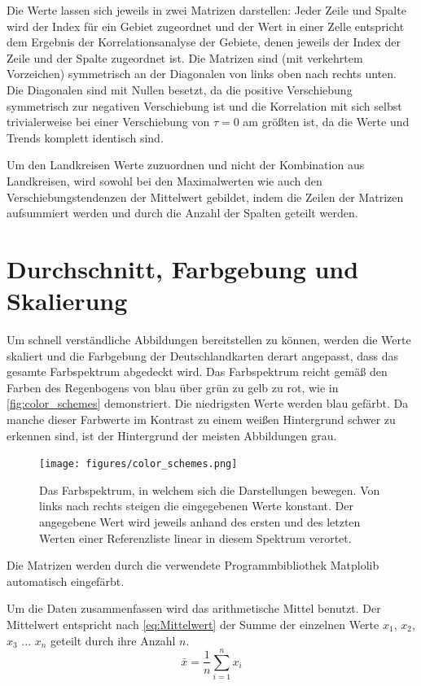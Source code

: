 Die Werte lassen sich jeweils in zwei Matrizen darstellen: Jeder Zeile und Spalte wird der Index für ein Gebiet zugeordnet und der Wert in einer Zelle entspricht dem Ergebnis der Korrelationsanalyse der Gebiete, denen jeweils der Index der Zeile und der Spalte zugeordnet ist.
Die Matrizen sind (mit verkehrtem Vorzeichen) symmetrisch an der Diagonalen von links oben nach rechts unten. Die Diagonalen sind mit Nullen besetzt, da die positive Verschiebung symmetrisch zur negativen Verschiebung ist und die Korrelation mit sich selbst trivialerweise bei einer Verschiebung von $\tau=0$ am größten ist, da die Werte und Trends komplett identisch sind.

Um den Landkreisen Werte zuzuordnen und nicht der Kombination aus Landkreisen, wird sowohl bei den Maximalwerten wie auch den Verschiebungstendenzen der Mittelwert gebildet, indem die Zeilen der Matrizen aufsummiert werden und durch die Anzahl der Spalten geteilt werden.
\section{Durchschnitt, Farbgebung und Skalierung}\label{sec:Durchschnitt, Farbgebung und Skalierung}
Um schnell verständliche Abbildungen bereitstellen zu können, werden die Werte skaliert und die Farbgebung der Deutschlandkarten derart angepasst, dass das gesamte Farbspektrum abgedeckt wird. Das Farbspektrum reicht gemäß den Farben des Regenbogens von blau über grün zu gelb zu rot, wie in \autoref{fig:color_schemes} demonstriert. Die niedrigsten Werte werden blau gefärbt.
Da manche dieser Farbwerte im Kontrast zu einem weißen Hintergrund schwer zu erkennen sind, ist der Hintergrund der meisten Abbildungen grau.

\begin{figure}
    \centering
    \texttt{[image: figures/color\_schemes.png]}
    \caption{Das Farbspektrum, in welchem sich die Darstellungen bewegen. Von links nach rechts steigen die eingegebenen Werte konstant. Der angegebene Wert wird jeweils anhand des ersten und des letzten Werten einer Referenzliste linear in diesem Spektrum verortet.}
    \label{fig:color_schemes}
\end{figure}

Die Matrizen werden durch die verwendete Programmbibliothek \glqq{}Matplolib\grqq{} automatisch eingefärbt.


Um die Daten zusammenfassen wird das arithmetische Mittel benutzt. Der Mittelwert entspricht nach \autoref{eq:Mittelwert} der Summe der einzelnen Werte $x_1$, $x_2$, $x_3$ ... $x_n$ geteilt durch ihre Anzahl $n$.
\begin{equation}\label{eq:Mittelwert}
    \bar x = \frac{1}{n}\sum_{i=1}^n x_i
\end{equation}